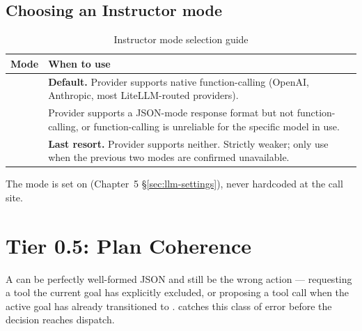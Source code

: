 \subsection{Choosing an Instructor mode}
\label{subsec:instructor-mode}

\begin{table}[htbp]
\centering
\caption{Instructor mode selection guide}
\label{tab:instructor-modes}
\renewcommand{\arraystretch}{1.4}
\begin{tabularx}{\linewidth}{@{} l P{5.6cm} @{}}
\toprule
\textbf{Mode} & \textbf{When to use} \\
\midrule
{}   & \textbf{Default.}  Provider supports native function-calling
                 (OpenAI, Anthropic, most LiteLLM-routed providers). \\
    & Provider supports a JSON-mode response format but not
                 function-calling, or function-calling is unreliable for
                 the specific model in use. \\
& \textbf{Last resort.}  Provider supports neither.
                 Strictly weaker; only use when the previous two modes
                 are confirmed unavailable. \\
\bottomrule
\end{tabularx}
\end{table}

The mode is set on  (Chapter~5
§\ref{sec:llm-settings}), never hardcoded at the call site.

\section{Tier 0.5: Plan Coherence}
\label{sec:plan-coherence}

A  can be perfectly well-formed JSON and still be the
wrong action --- requesting a tool the current goal has explicitly
excluded, or proposing a tool call when the active goal has already
transitioned to .  
catches this class of error before the decision reaches dispatch.

